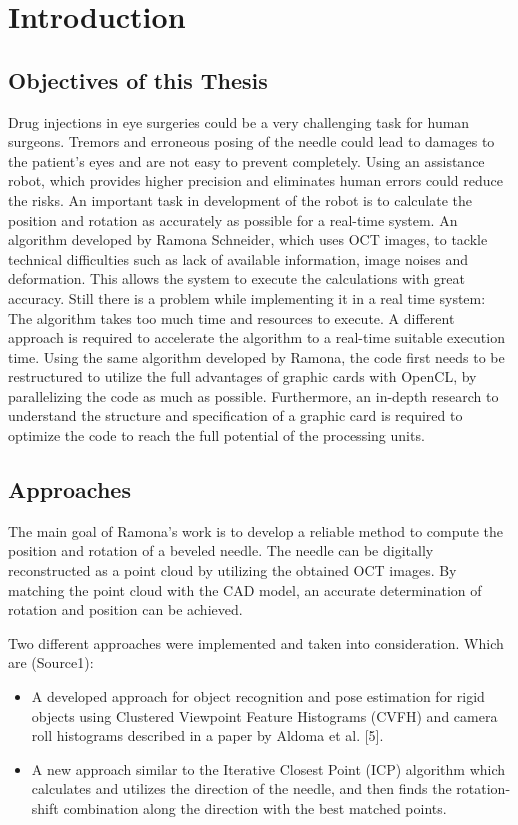 \chapter{Introduction}
\section{Objectives of this Thesis}

   
Drug injections in eye surgeries could be a very challenging task for human surgeons. Tremors and erroneous posing of the needle could lead to damages to the patient’s eyes and are not easy to prevent completely. Using an assistance robot, which provides higher precision and eliminates human errors could reduce the risks. An important task in development of the robot is to calculate the position and rotation as accurately as possible for a real-time system. An algorithm developed by Ramona Schneider, which uses OCT images, to tackle technical difficulties such as lack of available information, image noises and deformation. This allows the system to execute the calculations with great accuracy. Still there is a problem while implementing it in a real time system: The algorithm takes too much time and resources to execute. A different approach is required to accelerate the algorithm to a real-time suitable execution time. Using the same algorithm developed by Ramona, the code first needs to be restructured to utilize the full advantages of graphic cards with OpenCL, by parallelizing the code as much as possible. Furthermore, an in-depth research to understand the structure and specification of a graphic card is required to optimize the code to reach the full potential of the processing units.
    
\section{Approaches}

The main goal of Ramona’s work is to develop a reliable method to compute the position and rotation of a beveled needle. The needle can be digitally reconstructed as a point cloud by utilizing the obtained OCT images. By matching the point cloud with the CAD model, an accurate determination of rotation and position can be achieved.

Two different approaches were implemented and taken into consideration. Which are (Source1):

\begin{itemize}
	\item A developed approach for object recognition and pose estimation for rigid objects using Clustered Viewpoint Feature Histograms (CVFH) and camera roll histograms described in a paper by Aldoma et al. [5].

	\item A new approach similar to the Iterative Closest Point (ICP) algorithm which calculates and utilizes the direction of the needle, and then finds the rotation-shift combination along the direction with the best matched points.
\end{itemize} 

